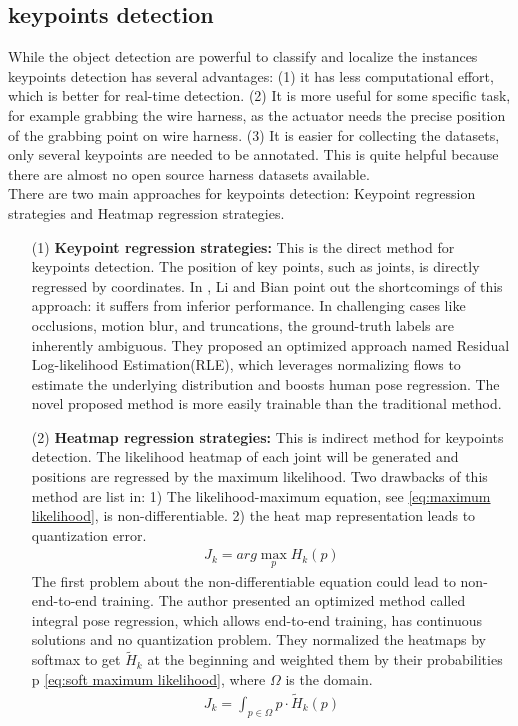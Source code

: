 \subsection{keypoints detection}
    While the object detection are powerful to classify and localize the instances keypoints detection has several advantages: (1) it has less computational effort, which
    is better for real-time detection. (2) It is more useful for some specific task, for example grabbing the wire harness, as the actuator needs the precise position of the grabbing point
    on wire harness. (3) It is easier for collecting the datasets, only several keypoints are needed to be annotated. This is quite helpful because there are almost no open 
    source harness datasets available.\\
    There are two main approaches for keypoints detection: Keypoint regression strategies and Heatmap regression strategies. 
    \begin{itemize}
        \item [(1)] \textbf{Keypoint regression strategies: } This is the direct method for keypoints detection. The position of key points, such as joints, is directly 
        regressed by coordinates\cite{Toshev_2014_CVPR}. In \cite{9710108}, Li and Bian point out the shortcomings of this approach: it suffers from inferior performance. 
        In challenging cases like occlusions, motion blur, and truncations, the ground-truth labels are inherently ambiguous. They proposed an optimized approach named  
        Residual Log-likelihood Estimation(RLE), which leverages normalizing flows to estimate the underlying distribution and boosts human pose regression. The novel 
        proposed method is more easily trainable than the traditional method.

        \item [(2)] \textbf{Heatmap regression strategies: } This is indirect method for keypoints detection. The likelihood heatmap of each joint will be generated and positions 
        are regressed by the maximum likelihood\cite{10.1007/978-3-319-46484-8_29}. Two drawbacks of this method are list in\cite{Sun_2018_ECCV}: 1) The likelihood-maximum equation, 
        see \autoref{eq:maximum likelihood}, is non-differentiable. 2) the heat map representation leads to quantization error.
        \begin{align}
            J_{k}=arg\max_{p}H_{k} (p)
             \label{eq:maximum likelihood}
        \end{align}
        The first problem about the non-differentiable equation could lead to non-end-to-end training. The author presented an optimized method called integral pose regression, which
        allows end-to-end training, has continuous solutions and no quantization problem. They normalized the heatmaps by softmax to get $\widetilde{H}_{k}$ at the beginning and weighted 
        them by their probabilities p \autoref{eq:soft maximum likelihood}, where $\Omega$ is the domain.\\
        \begin{align}
            J_{k}=\int_{p\in \Omega } p\cdot \widetilde{H}_{k}(p) 
             \label{eq:soft maximum likelihood}
        \end{align}
    \end{itemize}
